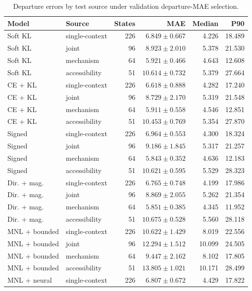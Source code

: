 \begin{table}[pos=htbp]
\centering\footnotesize
\caption{Departure errors by test source under validation departure-MAE selection.}
\label{tab:departure_sources}
\setlength{\tabcolsep}{3pt}
\renewcommand{\arraystretch}{1.12}
\begin{tabular}{@{}llrrrr@{}}
\toprule
Model & Source & States & MAE & Median & P90 \\
\midrule
Soft KL & single-context & 226 & $6.849\pm0.667$ & 4.226 & 18.489 \\
Soft KL & joint & 96 & $8.923\pm2.010$ & 5.378 & 21.530 \\
Soft KL & mechanism & 64 & $5.921\pm0.466$ & 4.643 & 12.608 \\
Soft KL & accessibility & 51 & $10.614\pm0.732$ & 5.379 & 27.664 \\
CE + KL & single-context & 226 & $6.618\pm0.888$ & 4.282 & 17.240 \\
CE + KL & joint & 96 & $8.729\pm2.170$ & 5.319 & 21.548 \\
CE + KL & mechanism & 64 & $5.911\pm0.558$ & 4.546 & 12.851 \\
CE + KL & accessibility & 51 & $10.453\pm0.769$ & 5.354 & 27.870 \\
Signed & single-context & 226 & $6.964\pm0.553$ & 4.300 & 18.324 \\
Signed & joint & 96 & $9.186\pm1.845$ & 5.317 & 21.257 \\
Signed & mechanism & 64 & $5.843\pm0.352$ & 4.636 & 12.183 \\
Signed & accessibility & 51 & $10.621\pm0.595$ & 5.529 & 28.323 \\
Dir. + mag. & single-context & 226 & $6.765\pm0.748$ & 4.199 & 17.986 \\
Dir. + mag. & joint & 96 & $8.869\pm2.055$ & 5.262 & 21.354 \\
Dir. + mag. & mechanism & 64 & $5.851\pm0.385$ & 4.345 & 11.952 \\
Dir. + mag. & accessibility & 51 & $10.675\pm0.528$ & 5.560 & 28.118 \\
MNL + bounded & single-context & 226 & $10.622\pm1.429$ & 8.019 & 22.556 \\
MNL + bounded & joint & 96 & $12.294\pm1.512$ & 10.099 & 24.505 \\
MNL + bounded & mechanism & 64 & $9.447\pm2.162$ & 8.102 & 17.805 \\
MNL + bounded & accessibility & 51 & $13.805\pm1.021$ & 10.171 & 28.499 \\
MNL + neural & single-context & 226 & $6.807\pm0.672$ & 4.429 & 17.822 \\

\end{tabular}
\end{table}
